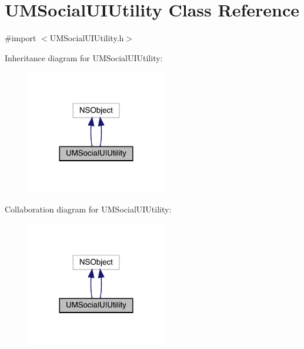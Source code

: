 \hypertarget{interface_u_m_social_u_i_utility}{}\section{U\+M\+Social\+U\+I\+Utility Class Reference}
\label{interface_u_m_social_u_i_utility}


{\ttfamily \#import $<$U\+M\+Social\+U\+I\+Utility.\+h$>$}



Inheritance diagram for U\+M\+Social\+U\+I\+Utility\+:\nopagebreak
\begin{figure}[H]
\begin{center}
\leavevmode
\includegraphics[width=173pt]{interface_u_m_social_u_i_utility__inherit__graph}
\end{center}
\end{figure}


Collaboration diagram for U\+M\+Social\+U\+I\+Utility\+:\nopagebreak
\begin{figure}[H]
\begin{center}
\leavevmode
\includegraphics[width=173pt]{interface_u_m_social_u_i_utility__coll__graph}
\end{center}
\end{figure}
